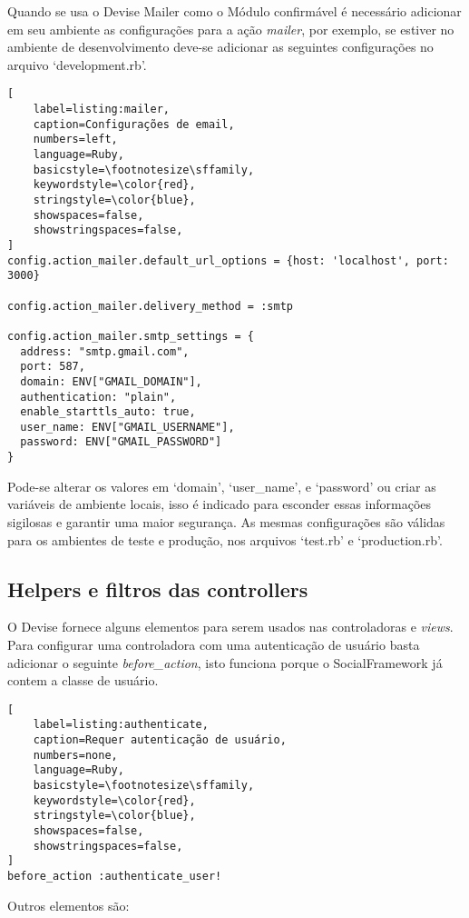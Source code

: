 Quando se usa o Devise Mailer como o Módulo confirmável é necessário adicionar em seu ambiente as configurações para a ação \textit{mailer}, por exemplo, se estiver no ambiente de desenvolvimento deve-se adicionar as seguintes configurações no arquivo `development.rb'.

\begin{lstlisting}[
    label=listing:mailer,
    caption=Configurações de email,
    numbers=left,
    language=Ruby,
    basicstyle=\footnotesize\sffamily,
    keywordstyle=\color{red},
    stringstyle=\color{blue},
    showspaces=false,
    showstringspaces=false,
]
config.action_mailer.default_url_options = {host: 'localhost', port: 3000}

config.action_mailer.delivery_method = :smtp

config.action_mailer.smtp_settings = {
  address: "smtp.gmail.com",
  port: 587,
  domain: ENV["GMAIL_DOMAIN"],
  authentication: "plain",
  enable_starttls_auto: true,
  user_name: ENV["GMAIL_USERNAME"],
  password: ENV["GMAIL_PASSWORD"]
}
\end{lstlisting}

Pode-se alterar os valores em `domain', `user\_name', e `password' ou criar as variáveis de ambiente locais, isso é indicado para esconder essas informações sigilosas e garantir uma maior segurança. As mesmas configurações são válidas para os ambientes de teste e produção, nos arquivos `test.rb' e `production.rb'.

\subsection{Helpers e filtros das controllers}

O Devise fornece alguns elementos para serem usados nas controladoras e \textit{views}. Para configurar uma controladora com uma autenticação de usuário basta adicionar o seguinte \textit{before\_action}, isto funciona porque o SocialFramework já contem a classe de usuário.

\begin{lstlisting}[
    label=listing:authenticate,
    caption=Requer autenticação de usuário,
    numbers=none,
    language=Ruby,
    basicstyle=\footnotesize\sffamily,
    keywordstyle=\color{red},
    stringstyle=\color{blue},
    showspaces=false,
    showstringspaces=false,
]
before_action :authenticate_user!
\end{lstlisting}

Outros elementos são:

